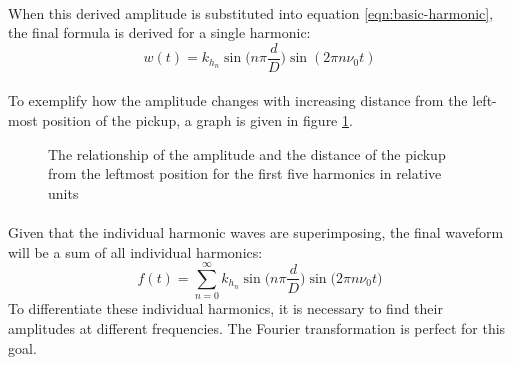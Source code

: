 \documentclass{article}
\begin{document}
\paragraph*{}
When this derived amplitude is substituted into equation 
\ref{eqn:basic-harmonic}, the final formula is derived for a single harmonic:
\begin{equation}
	w(t) = k_{h_n} \sin\Big(n \pi \frac{d}{D}\Big) \sin(2 \pi n \nu_0 t)
	\label{eqn:general-harmonic}
\end{equation}

\paragraph*{}
To exemplify how the amplitude changes with increasing distance from the 
left-most position of the pickup, a graph is given in figure 
\ref{fig:harmonic-amp-relation}.

\begin{figure}[ht]
	\centering
	\caption{The relationship of the amplitude and the distance of the pickup 
	from the leftmost position for the first five harmonics in relative units}
	\label{fig:harmonic-amp-relation}
\end{figure}

\paragraph*{}
Given that the individual harmonic waves are superimposing, the final waveform 
will be a sum of all individual harmonics:
$$f(t) = \sum_{n=0}^{\infty} k_{h_n} \sin \bigg(n \pi \frac{d}{D} \bigg) 
\sin \bigg(2 \pi n \nu_0 t \bigg)$$
To differentiate these individual harmonics, it is necessary to find their 
amplitudes at different frequencies. The Fourier transformation is perfect for 
this goal.
\end{document}
